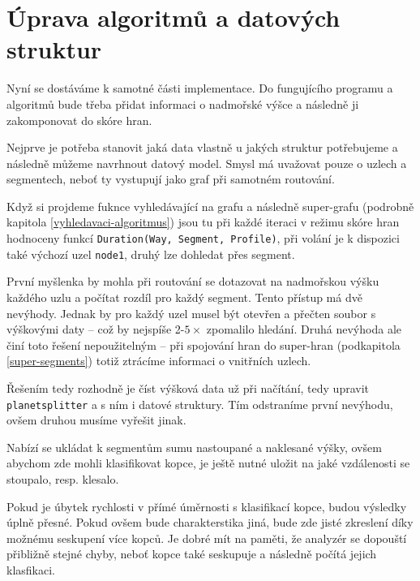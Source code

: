 \documentclass[thesis=B,czech]{FITthesis}[2012/06/26]
\begin{document}
\section{Úprava algoritmů a datových struktur}
\label{uprava-algoritmu}
Nyní se dostáváme k samotné části implementace. Do fungujícího programu a algoritmů bude třeba přidat informaci o nadmořské výšce a následně ji zakomponovat do skóre hran.

Nejprve je potřeba stanovit jaká data vlastně u jakých struktur potřebujeme a následně můžeme navrhnout datový model. Smysl má uvažovat pouze o uzlech a segmentech, neboť ty vystupují jako graf při samotném routování.

Když si projdeme fuknce vyhledávající na grafu a následně super-grafu (podrobně kapitola \ref{vyhledavaci-algoritmus}) jsou tu při každé iteraci  v režimu  skóre hran hodnoceny funkcí \verb|Duration(Way, Segment, Profile)|, při volání je k dispozici také výchozí uzel \verb|node1|, druhý lze dohledat přes segment.

První myšlenka by mohla při routování se dotazovat na nadmořskou výšku každého uzlu a počítat rozdíl pro každý segment. Tento přístup má dvě nevýhody. Jednak by pro každý uzel musel být otevřen a přečten soubor s výškovými daty -- což by nejspíše 2-$5\times$ zpomalilo hledání. Druhá nevýhoda ale činí toto řešení nepoužitelným -- při spojování hran do super-hran (podkapitola \ref{super-segments}) totiž ztrácíme informaci o vnitřních uzlech.

Řešením tedy rozhodně je číst výšková data už při načítání, tedy upravit \verb|planetsplitter| a s ním i datové struktury. Tím odstraníme první nevýhodu, ovšem druhou musíme vyřešit jinak. 

Nabízí se ukládat k segmentům sumu nastoupané a naklesané výšky, ovšem abychom zde mohli klasifikovat kopce, je ještě nutné uložit na jaké vzdálenosti se stoupalo, resp. klesalo. 

Pokud je úbytek rychlosti v přímé úměrnosti s klasifikací kopce, budou výsledky úplně přesné. Pokud ovšem bude charakterstika jiná, bude zde jisté zkreslení díky možnému seskupení více kopců. Je dobré mít na paměti, že analyzér se dopouští přibližně stejné chyby, neboť kopce také seskupuje a následně počítá jejich klasfikaci.
\end{document}
